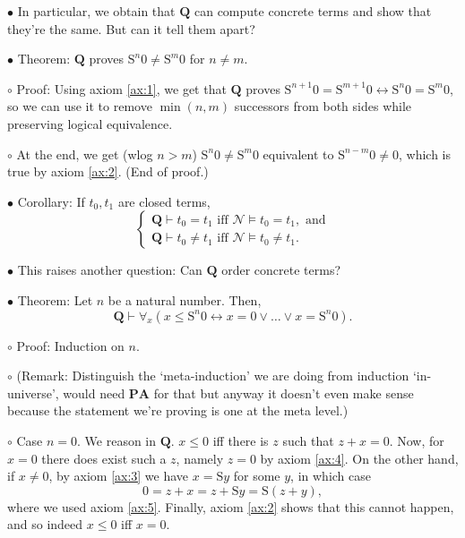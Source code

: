 \documentclass{article}
\newcommand{\RQ}{\mathbf{Q}}
\newcommand{\PA}{\mathbf{PA}}
\newcommand{\TN}{\mathcal{N}}
\newcommand{\suc}{\mathrm{S}}
\newcommand\Point[1]{\noindent \hspace{\labelsep} {\large $\bullet$ #1} \smallskip}
\newcommand\point[1]{\noindent \hspace{\labelsep} {\small $\circ$ #1} \smallskip}
\newcommand\timestamp[1]{}
\newcommand\proofend{\hfill(End of proof.)}
\begin{document}
\Point{In particular, we obtain that $\RQ$ can compute concrete terms and show that they're the same. But can it tell them apart?}

\Point{Theorem: $\RQ$ proves $\suc^n 0 \neq \suc^m 0$ for $n \neq m$.}

\point{Proof: Using axiom \ref{ax:1}, we get that $\RQ$ proves $\suc^{n+1} 0 = \suc^{m+1} 0 \leftrightarrow \suc^n 0 = \suc^m 0$, so we can use it to remove $\min(n,m)$ successors from both sides while preserving logical equivalence.}

\point{At the end, we get (wlog $n>m$) $\suc^n 0 \neq \suc^m 0$ equivalent to $\suc^{n-m} 0 \neq 0$, which is true by axiom \ref{ax:2}.
\proofend}

\Point{Corollary: If $t_0, t_1$ are closed terms,
\begin{equation}
\begin{cases} \RQ \vdash t_0 = t_1 \text{ iff } \TN \vDash t_0 = t_1,\text{ and}\\
\RQ \vdash t_0 \neq t_1 \text{ iff } \TN \vDash t_0 \neq t_1.
\end{cases}
\end{equation}}

\timestamp{22 min}

\Point{This raises another question: Can $\RQ$ order concrete terms?}

\Point{Theorem: Let $n$ be a natural number. Then,
\begin{equation}
\RQ \vdash \forall_x (x \leq \suc^n 0 \leftrightarrow x = 0 \lor \dots \lor x = \suc^n 0).
\end{equation}
}

\point{Proof: Induction on $n$.}

\point{(Remark: Distinguish the `meta-induction' we are doing from induction `in-universe', would need $\PA$ for that but anyway it doesn't even make sense because the statement we're proving is one at the meta level.)}

\point{Case $n = 0$. We reason in $\RQ$. $x \leq 0$ iff there is $z$ such that $z+x = 0$. Now, for $x = 0$ there does exist such a $z$, namely $z = 0$ by axiom \ref{ax:4}. On the other hand, if $x \neq 0$, by axiom \ref{ax:3} we have $x = \suc y$ for some $y$, in which case
\begin{equation}
0 = z+x = z + \suc y = \suc(z+y),
\end{equation}
where we used axiom \ref{ax:5}. Finally, axiom \ref{ax:2} shows that this cannot happen, and so indeed $x \leq 0$ iff $x = 0$.
}
\end{document}
